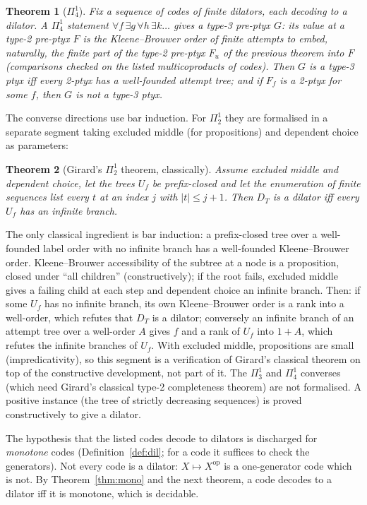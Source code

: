 \documentclass[11pt]{article}
\newtheorem{theorem}{Theorem}[section]
\theoremstyle{definition}
\theoremstyle{remark}
\begin{document}
\begin{theorem}[$\Pi^1_4$]
Fix a sequence of codes of finite dilators, each decoding to a dilator. A
$\Pi^1_4$ statement $\forall f\,\exists g\,\forall h\,\exists k\ldots$ gives a
type-3 pre-ptyx $G$: its value at a type-2 pre-ptyx $F$ is the
Kleene--Brouwer order of finite attempts to embed, naturally, the finite
part of the type-2 pre-ptyx $F_u$ of the previous theorem into $F$
(comparisons checked on the listed multicoproducts of codes). Then $G$ is a
type-3 ptyx iff every 2-ptyx has a well-founded attempt tree; and if $F_f$
is a 2-ptyx for some $f$, then $G$ is not a type-3 ptyx.
\end{theorem}

The converse directions use bar induction. For $\Pi^1_2$ they are
formalised in a separate segment taking excluded middle (for
propositions) and dependent choice as parameters:

\begin{theorem}[Girard's $\Pi^1_2$ theorem, classically]
Assume excluded middle and dependent choice, let the trees $U_f$ be
prefix-closed and let the enumeration of finite sequences list every $t$ at
an index $j$ with $|t|\le j+1$. Then $D_T$ is a dilator iff every $U_f$ has
an infinite branch.
\end{theorem}

The only classical ingredient is bar induction: a prefix-closed tree over a
well-founded label order with no infinite branch has a well-founded
Kleene--Brouwer order. Kleene--Brouwer accessibility of the subtree at a
node is a proposition, closed under ``all children'' (constructively);
if the root fails, excluded middle gives a failing child at each step and
dependent choice an infinite branch. Then: if some $U_f$ has no infinite
branch, its own Kleene--Brouwer order is a rank into a well-order, which
refutes that $D_T$ is a dilator; conversely an infinite branch of an
attempt tree over a well-order $A$ gives $f$ and a rank of $U_f$ into
$1+A$, which refutes the infinite branches of $U_f$. With excluded middle,
propositions are small (impredicativity), so this segment is a
verification of Girard's classical theorem on top of the constructive
development, not part of it. The $\Pi^1_3$ and $\Pi^1_4$ converses (which
need Girard's classical type-2 completeness theorem) are not formalised.
A positive instance (the tree of strictly decreasing sequences) is proved
constructively to give a dilator.

The hypothesis that the listed codes decode to dilators is discharged
for \emph{monotone} codes (Definition~\ref{def:dil}; for a code it suffices
to check the generators). Not every code is a dilator:
$X\mapsto X^{\mathrm{op}}$ is a one-generator code which is not. By
Theorem~\ref{thm:mono} and the next theorem, a code decodes to a dilator iff
it is monotone, which is decidable.
\end{document}
